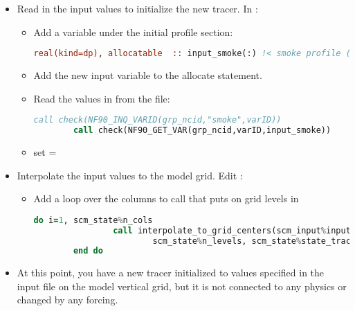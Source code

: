 \begin{enumerate}
\begin{itemize}
\begin{itemize}
		\item Add a new input variable in 
		\begin{lstlisting}[language = Fortran]
		real(kind=dp), allocatable              :: input_smoke(:)
		\end{lstlisting}
		\item In , allocate and initialize the new variable to 0.
		\end{itemize}
	\item Read in the input values to initialize the new tracer. In :
		\begin{itemize}
		\item Add a variable under the initial profile section:
		\begin{lstlisting}[language = Fortran]
		real(kind=dp), allocatable  :: input_smoke(:) !< smoke profile (fraction)
		\end{lstlisting}
		\item Add the new input variable to the allocate statement.
		\item Read the values in from the file:
		\begin{lstlisting}[language = Fortran]
		call check(NF90_INQ_VARID(grp_ncid,"smoke",varID))
		call check(NF90_GET_VAR(grp_ncid,varID,input_smoke))
		\end{lstlisting}
		\item set  = 
		\end{itemize}
	\item Interpolate the input values to the model grid. Edit :
		\begin{itemize}
		\item Add a loop over the columns to call  that puts  on grid levels in 
		\begin{lstlisting}[language = Fortran]
		do i=1, scm_state%n_cols
      			call interpolate_to_grid_centers(scm_input%input_nlev, scm_input%input_pres, scm_input%input_smoke, scm_state%pres_l(i,1,:), &
        				scm_state%n_levels, scm_state%state_tracer(i,1,:,scm_state%smoke_index,1), last_index_init, 1)
		end do
		\end{lstlisting}
		\end{itemize}
	\item At this point, you have a new tracer initialized to values specified in the input file on the model vertical grid, but it is not connected to any physics or changed by any forcing.

\end{itemize}
\end{enumerate}
